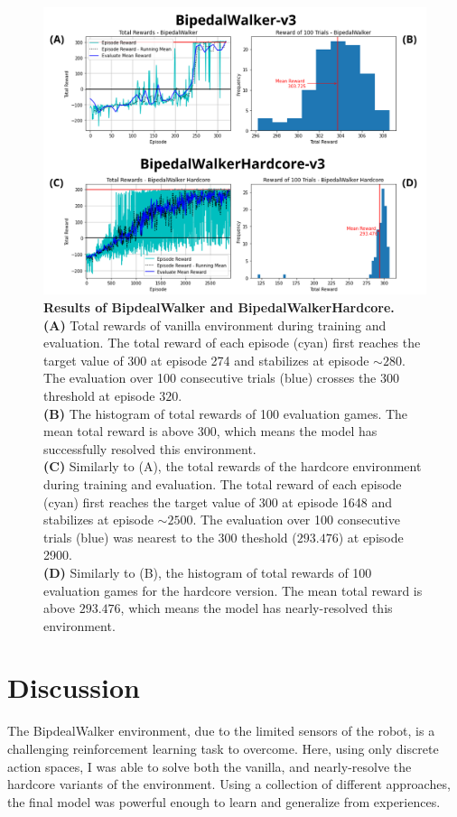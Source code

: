 \documentclass{article}
\begin{document}
\begin{multicols}{2}
 \begin{figure}
 \includegraphics[width=\textwidth]{scores}
 \caption{
 \label{fig:scores}
 \textbf{Results of BipdealWalker and BipedalWalkerHardcore.} \\
 \textbf{(A)} Total rewards of vanilla environment during training and evaluation. The total reward of each episode (cyan) first reaches the target value of 300 at episode 274 and stabilizes at episode $\sim 280$. The evaluation over 100 consecutive trials (blue) crosses the 300 threshold at episode $320$. \\
 \textbf{(B)} The histogram of total rewards of 100 evaluation games. The mean total reward is above 300, which means the model has successfully resolved this environment. \\
 \textbf{(C)} Similarly to (A), the total rewards of the hardcore environment during training and evaluation. The total reward of each episode (cyan) first reaches the target value of 300 at episode 1648 and stabilizes at episode $\sim 2500$. The evaluation over 100 consecutive trials (blue) was nearest to the 300 theshold ($293.476$) at episode 2900. \\
 \textbf{(D)} Similarly to (B), the histogram of total rewards of 100 evaluation games for the hardcore version. The mean total reward is above $293.476$, which means the model has nearly-resolved this environment.
 }
 \end{figure}
 
\section{Discussion}
The BipdealWalker environment, due to the limited sensors of the robot, is a challenging reinforcement learning task to overcome. Here, using only discrete action spaces, I was able to solve both the vanilla, and nearly-resolve the hardcore variants of the environment. Using a collection of different approaches, the final model was powerful enough to learn and generalize from experiences.


\end{multicols}
\end{document}
